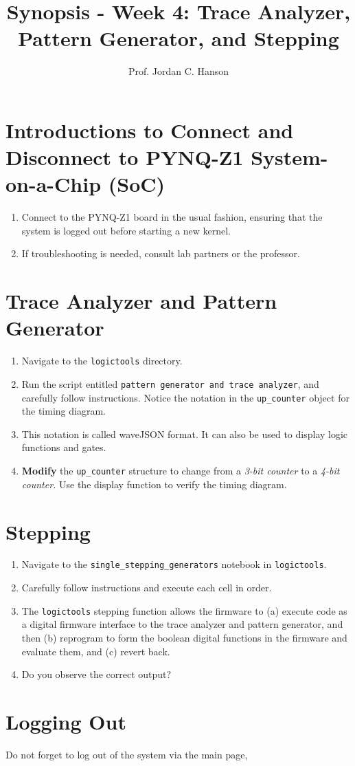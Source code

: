 \documentclass{article}
\begin{document}
\title{Synopsis - Week 4: Trace Analyzer, Pattern Generator, and Stepping}
\author{Prof. Jordan C. Hanson}

\maketitle

\section{Introductions to Connect and Disconnect to PYNQ-Z1 System-on-a-Chip (SoC)}

\begin{enumerate}
\item Connect to the PYNQ-Z1 board in the usual fashion, ensuring that the system is logged out before starting a new kernel.
\item If troubleshooting is needed, consult lab partners or the professor.
\end{enumerate}

\section{Trace Analyzer and Pattern Generator}

\begin{enumerate}
\item Navigate to the \verb+logictools+ directory.
\item Run the script entitled \verb+pattern generator and trace analyzer+, and carefully follow instructions.  Notice the notation in the \verb+up_counter+ object for the timing diagram.
\item This notation is called waveJSON format.  It can also be used to display logic functions and gates.
\item \textbf{Modify} the \verb+up_counter+ structure to change from a \textit{3-bit counter} to a \textit{4-bit counter.}  Use the display function to verify the timing diagram.
\end{enumerate}

\section{Stepping}

\begin{enumerate}
\item Navigate to the \verb+single_stepping_generators+ notebook in \verb+logictools+.
\item Carefully follow instructions and execute each cell in order.
\item The \verb+logictools+ stepping function allows the firmware to (a) execute code as a digital firmware interface to the trace analyzer and pattern generator, and then (b) reprogram to form the boolean digital functions in the firmware and evaluate them, and (c) revert back.
\item Do you observe the correct output?
\end{enumerate}

\section{Logging Out}

Do not forget to log out of the system via the main page, 
\end{document}
